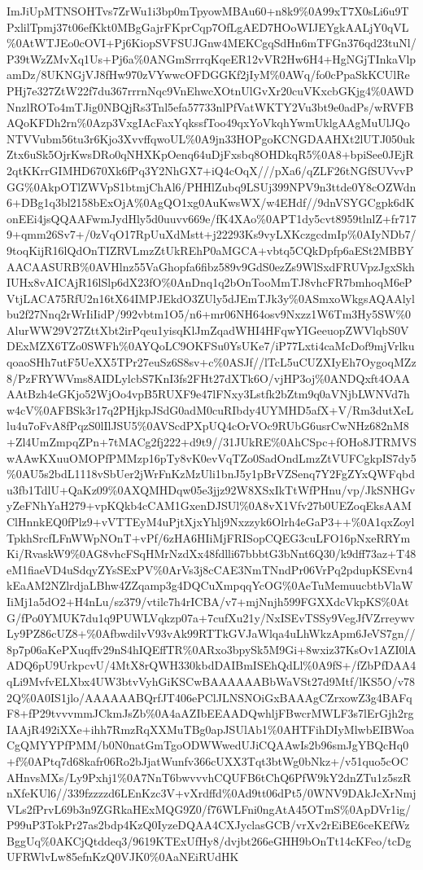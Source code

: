 \documentclass[]{article}
\begin{document}
ImJiUpMTNSOHTvs7ZrWu1i3bp0mTpyowMBAu60+n8k9\%0A99xT7X0sLi6u9TPxlilTpmj37t06efKkt0MBgGajrFKprCqp7OfLgAED7HOoWIJEYgkAALjY0qVL\%0AtWTJEo0cOVI+Pj6KiopSVFSUJGnw4MEKCgqSdHn6mTFGn376qd23tuNl/P39tWzZMvXq1Us+Pj6a\%0ANGmSrrrqKqeER12vVR2Hw6H4+HgNGjTInkaVlpamDz/8UKNGjVJ8fHw970zVYwwcOFDGGKf2jIyM\%0AWq/fo0cPpaSkKCUlRePHj7e327ZtW22f7du367rrrnNqc9VnEhwcXOtnUlGvXr20cuVKxcbGKjg4\%0AWDNnzlROTo4mTJig0NBQjRs3Tnl5efa57733nlPfVatWKTY2Vu3bt9e0adPs/wRVFBAQoKFDh2rn\%0Azp3VxgIAcFaxYqkssfToo49qxYoVkqhYwmUklgAAgMuUlJQoNTVVubm56tu3r6Kjo3XvvffqwoUL\%0A9jn33HOPgoKCNGDAAHXt2lUTJ050ukZtx6uSk5OjrKwsDRo0qNHXKpOenq64uDjFxsbq8OHDkqR5\%0A8+bpiSee0JEjR2qtKKrrGIMHD670Xk6fPq3Y2NhGX7+iQ4cOqX///pXa6/qZLF26tNGfSUVvvPGG\%0AkpOTlZWVpS1btmjChAl6/PHHlZubq9LSUj399NPV9n3ttde0Y8cOZWdn6+DBg1q3bl2158bExOjA\%0AgQO1xg0AuKwsWX/w4EHdf//9dnVSYGCgpk6dKonEEi4jsQQAAFwmJydHly5d0uuvv669e/fK4XAo\%0APT1dy5cvt8959tlnlZ+fr7179+qmm26Sv7+/0zVqO17RpUuXdMstt+j22293Ks9vyLXKczgcdmIp\%0AIyNDb7/9toqKijR16lQdOnTIZRVLmzZtUkREhP0aMGCA+vbtq5CQkDpfp6aESt2MBBYAACAASURB\%0AVHlnz55VaGhopfa6fibz589v9GdS0ezZs9WlSxdFRUVpzJgxSkhIUHx8vAICAjR16lSlp6dX23fO\%0AnDnq1q2bOnTooMmTJ8vhcFR7bmhoqM6ePVtjLACA75RfU2n16tX64IMPJEkdO3ZUly5dJEmTJk3y\%0ASmxoWkgsAQAAlylbu2f27Nnq2rWrIiIidP/992vbtm1O5/n6+mr06NH64osv9Nxzz1W6Tm3Hy5SW\%0AlurWW29V27ZttXbt2irPqeu1yisqKlJmZqadWHI4HFqwYIGeeuopZWVlqbS0VDExMZX6TZo0SWFh\%0AYQoLC9OKFSu0YsUKe7/iP77Lxti4caMcDof9mjVrlkuqoaoSHh7utF5UeXX5TPr27euSz6S8sv+c\%0ASJf//lTcL5uCUZXIyEh7OygoqMZz8/PzFRYWVms8AIDLylcbS7KnI3fs2FHt27dXTk6O/vjHP3oj\%0ANDQxft4OAAAAtBzh4eGKjo52WjOo4vpB5RUXF9e47lFNxy3Lstfk2bZtm9q0aVNjbLWNVd7hw4cV\%0AFBSk3r17q2PHjkpJSdG0adM0cuRIbdy4UYMHD5afX+V/Rm3dutXeLlu4u7oFvA8fPqzS0lIlJSU5\%0AVScdPXpUQ4cOrVOc9RUbG6usrCwNHz682nM8+Zl4UmZmpqZPn+7tMACg2fj222+d9t9//31JUkRE\%0AhCSpc+fOHo8JTRMVSwAAwKXuuOMOPfPMMzp16pTy8vK0evVqTZo0SadOndLmzZtVUFCgkpIS7dy5\%0AU5s2bdL1118vSbUer2jWrFnKzMzUli1bnJ5y1pBrVZSenq7Y2FgZYxQWFqbdu3fb1TdlU+QaKz09\%0AXQMHDqw05e3jjz92W8XSxIkTtWfPHnu/vp/JkSNHGvyZeFNhYaH279+vpKQkb4cCAM1GxenDJSUl\%0A8vX1Vfv27b0UEZoqEksAAMClHnnkEQ0fPlz9+vVTTEyM4uPjtXjxYhlj9Nxzzyk6Olrh4eGaP3++\%0A1qxZoylTpkhSrcfLFnWWpNOnT+vPf/6zHA6HIiMjFRISopCQEG3cuLFO16pNxeRRYmKi/RvaskW9\%0AG8vhcFSqHMrNzdXx48fdlli67bbbtG3bNnt6Q30/k9dff73az+T48eM1fiaeVD4uSdqyZYsSExPV\%0ArVs3j8cCAE3NmTNndPr06VrPq2pdupKSEvn4kEaAM2NZlrdjaLBhw4ZZqamp3g4DQCuXmpqqYcOG\%0AeTuMemuucbtbVlaWIiMj1a5dO2+H4nLu/sz379/vtilc7h4rICBA/v7+mjNnjh599FGXXdcVkpKS\%0AtG/fPo0YMUK7du1q9PUWLVqkzp07a+7cufXu21y/NxISEvTSSy9VegJfVZrreywvLy9PZ86cUZ8+\%0AfbwdilvV93vAk99RTTkGVJaWlqa4uLhWkzApm6JeVS7gn//8p7p06aKePXuqffv29nS4hIQEffTR\%0ARxo3bpySk5M9Gi+8wxiz37KsOv1AZI0lAADQ6pU9UrkpcvU/4MtX8rQWH330kbdDAIBmISEhQdLl\%0A9fS+/fZbPfDAA4qLi9MvfvELXbx4UW3btvVyhGiKSCwBAAAAAABbWaVSt27d9Mtf/lKS5O/v782Q\%0A0IS1jlo/AAAAAABQrfJT406ePClJLNSNOiGxBAAAgCZrxowZ3g4BAFqF8+fP29tvvvmmJCkmJsZb\%0A4aAZIbEEAADQwhljFBwcrMWLF3s7lErGjh2rgIAAjR492iXXe+ihh7RmzRqXXMuTBg0apJSUlAb1\%0AHTFihDIyMlwbEIBWoaCgQMYYPfPMM/b0N0natGmTgoODWWwedUJiCQAAwIs2b96smJgYBQcHq0+f\%0APtq7d68kafr06Ro2bJjatWunfv366cUXX3Tqt3btWg0bNkz+/v51quo5cOCAHnvsMXs/Ly9Pxhj1\%0A7NnT6bwvvvhCQUFB6tChQ6PfW9kY2dnZTu1z5szRnXfeKUl6//339fzzzzd6LEnKzc3V+vXrdffd\%0Ad9tt06dPt5/0WNV9DAkJcXrNmjVLs2fPrvL69b3n9ZGRkaHExMQG9Z0/f76WLFni0ngAtA45OTmS\%0ApDVr1ig/P99uP3TokPr27as2bdp4KzQ0IyzeDQAA4CXJyclasGCB/vrXv2rEiBE6ceKEfWzBggUq\%0AKCjQtddeq3/9619KTExUfHy8/dvjbt266eGHH9bOnTt14cKFeo/tcDgUFRWlvLw85efnKzQ0VJK0\%0AaNEiRUdHK
\end{document}
